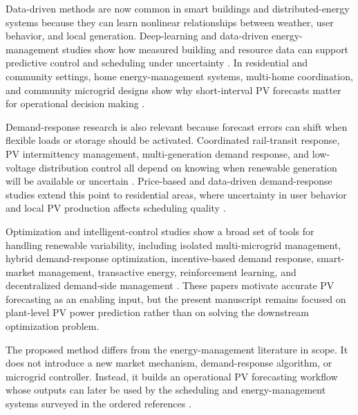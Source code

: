 Data-driven methods are now common in smart buildings and distributed-energy systems because they can learn nonlinear relationships between weather, user behavior, and local generation. Deep-learning and data-driven energy-management studies show how measured building and resource data can support predictive control and scheduling under uncertainty \cite{ref04,ref07,ref08,ref09}. In residential and community settings, home energy-management systems, multi-home coordination, and community microgrid designs show why short-interval PV forecasts matter for operational decision making \cite{ref10,ref18,ref20,ref25}.

Demand-response research is also relevant because forecast errors can shift when flexible loads or storage should be activated. Coordinated rail-transit response, PV intermittency management, multi-generation demand response, and low-voltage distribution control all depend on knowing when renewable generation will be available or uncertain \cite{ref03,ref13,ref16,ref21}. Price-based and data-driven demand-response studies extend this point to residential areas, where uncertainty in user behavior and local PV production affects scheduling quality \cite{ref22,ref23,ref24}.

Optimization and intelligent-control studies show a broad set of tools for handling renewable variability, including isolated multi-microgrid management, hybrid demand-response optimization, incentive-based demand response, smart-market management, transactive energy, reinforcement learning, and decentralized demand-side management \cite{ref14,ref15,ref28,ref29,ref31,ref32,ref38}. These papers motivate accurate PV forecasting as an enabling input, but the present manuscript remains focused on plant-level PV power prediction rather than on solving the downstream optimization problem.

The proposed method differs from the energy-management literature in scope. It does not introduce a new market mechanism, demand-response algorithm, or microgrid controller. Instead, it builds an operational PV forecasting workflow whose outputs can later be used by the scheduling and energy-management systems surveyed in the ordered references \cite{ref35,ref36,ref37,ref39,ref40}.
